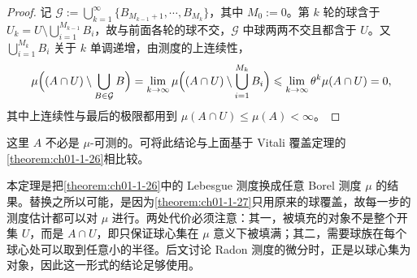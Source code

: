 \documentclass[../../main.tex]{subfiles}%
\begin{document}
\begin{proof}
记 $\mathcal{G}:=\bigcup_{k=1}^{\infty}\{B_{M_{k-1}+1},\cdots,B_{M_k}\}$，其中 $M_0:=0$。第 $k$ 轮的球含于 $U_k=U\setminus\bigcup_{i=1}^{M_{k-1}}B_i$，故与前面各轮的球不交，$\mathcal{G}$ 中球两两不交且都含于 $U$。又 $\bigcup_{i=1}^{M_k}B_i$ 关于 $k$ 单调递增，由测度的上连续性，
\begin{align*}
\mu\Bigl((A\cap U)\setminus\bigcup_{B\in\mathcal{G}}B\Bigr)
=\lim_{k\to\infty}\mu\Bigl((A\cap U)\setminus\bigcup_{i=1}^{M_k}B_i\Bigr)
\leqslant\lim_{k\to\infty}\theta^{k}\mu(A\cap U)=0,
\end{align*}
其中上连续性与最后的极限都用到 $\mu(A\cap U)\leqslant\mu(A)<\infty$。
\end{proof}

\begin{remark}\label{remark:ch01-thm-1-28-比较}
这里 $A$ 不必是 $\mu$-可测的。可将此结论与上面基于 Vitali 覆盖定理的\cref{theorem:ch01-1-26}相比较。%
\end{remark}

\begin{remark}\label{remark:ch01-thm-1-28-动机}
本定理是把\cref{theorem:ch01-1-26}中的 Lebesgue 测度换成任意 Borel 测度 $\mu$ 的结果。替换之所以可能，是因为\cref{theorem:ch01-1-27}只用原来的球覆盖，故每一步的测度估计都可以对 $\mu$ 进行。两处代价必须注意：其一，被填充的对象不是整个开集 $U$，而是 $A\cap U$，即只保证球心集在 $\mu$ 意义下被填满；其二，需要球族在每个球心处可以取到任意小的半径。后文讨论 Radon 测度的微分时，正是以球心集为对象，因此这一形式的结论足够使用。%
\end{remark}
\end{document}
